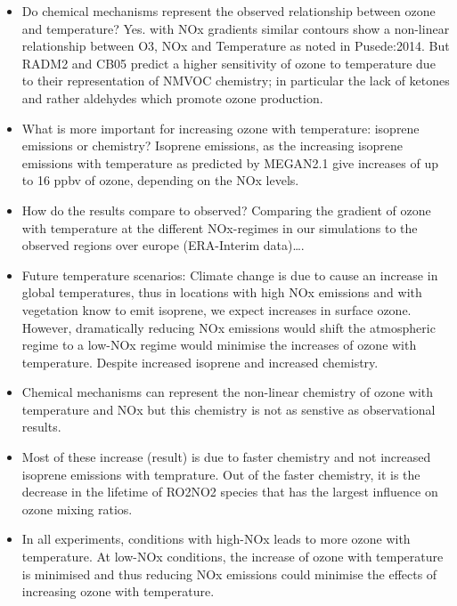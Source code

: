 \documentclass[11pt,a4paper]{article}
\begin{document}
\begin{itemize}
    \item Do chemical mechanisms represent the observed relationship between ozone and temperature? Yes. with NOx gradients similar contours show a non-linear relationship between O3, NOx and Temperature as noted in Pusede:2014. But RADM2 and CB05 predict a higher sensitivity of ozone to temperature due to their representation of NMVOC chemistry; in particular the lack of ketones and rather aldehydes which promote ozone production.
    \item What is more important for increasing ozone with temperature: isoprene emissions or chemistry? Isoprene emissions, as the increasing isoprene emissions with temperature as predicted by MEGAN2.1 give increases of up to 16 ppbv of ozone, depending on the NOx levels.
    \item How do the results compare to observed? Comparing the gradient of ozone with temperature at the different NOx-regimes in our simulations to the observed regions over europe (ERA-Interim data)\dots.
    \item Future temperature scenarios: Climate change is due to cause an increase in global temperatures, thus in locations with high NOx emissions and with vegetation know to emit isoprene, we expect increases in surface ozone. However, dramatically reducing NOx emissions would shift the atmospheric regime to a low-NOx regime would minimise the increases of ozone with temperature. Despite increased isoprene and increased chemistry.
    \item Chemical mechanisms can represent the non-linear chemistry of ozone with temperature and NOx but this chemistry is not as senstive as observational results.
    \item Most of these increase (result) is due to faster chemistry and not increased isoprene emissions with temprature. Out of the faster chemistry, it is the decrease in the lifetime of RO2NO2 species that has the largest influence on ozone mixing ratios.
    \item In all experiments, conditions with high-NOx leads to more ozone with temperature. At low-NOx conditions, the increase of ozone with temperature is minimised and thus reducing NOx emissions could minimise the effects of increasing ozone with temperature.
\end{itemize}


 
\end{document}
